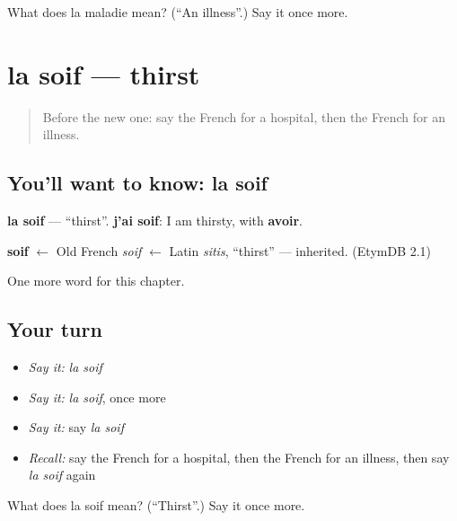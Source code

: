 \begin{tcolorbox}[breakable,colback=teal!4,colframe=teal!35!black,title={Before you move on}]
What does la maladie mean? (\textquotedblleft{}An illness\textquotedblright{}.) Say it once more.
\end{tcolorbox}
\section[la soif]{la soif — thirst}

\label{lesson:FR-C54-soif}



\begin{quote}
Before the new one: say the French for a hospital, then the French for an illness.
\end{quote}

\subsection*{You'll want to know: la soif}
\textbf{la soif} — \textquotedblleft{}thirst\textquotedblright{}. \textbf{j'ai soif}: I am thirsty, with \textbf{avoir}.

\begin{cousinweb}
\textbf{soif} $\leftarrow$ Old French \emph{soif} $\leftarrow$ Latin \emph{sitis}, \textquotedblleft{}thirst\textquotedblright{} — inherited. (EtymDB 2.1)
\end{cousinweb}

\begin{grammarlens}[title={What you've built}]
One more word for this chapter.
\end{grammarlens}

\subsection*{Your turn}
\begin{itemize}
\raggedright
  \item \emph{Say it:} \emph{la soif}
  \item \emph{Say it:} \emph{la soif}, once more
  \item \emph{Say it:} say \emph{la soif}
  \item \emph{Recall:} say the French for a hospital, then the French for an illness, then say \emph{la soif} again
\end{itemize}

\begin{tcolorbox}[breakable,colback=teal!4,colframe=teal!35!black,title={Before you move on}]
What does la soif mean? (\textquotedblleft{}Thirst\textquotedblright{}.) Say it once more.
\end{tcolorbox}
